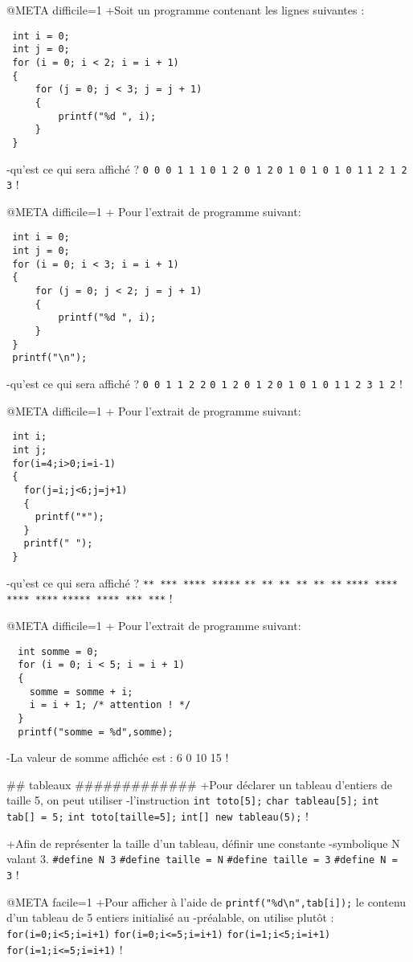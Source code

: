 @META difficile=1
+Soit un programme contenant les lignes suivantes :
 \begin{verbatim}
 int i = 0;
 int j = 0;
 for (i = 0; i < 2; i = i + 1) 
 {
     for (j = 0; j < 3; j = j + 1) 
     {
         printf("%d ", i);
     }
 }
 \end{verbatim}
-qu'est ce qui sera affiché ?
 \verb|0 0 0 1 1 1|
 \verb|0 1 2 0 1 2|
 \verb|0 1 0 1 0 1 0 1|
 \verb|1 2 1 2 3|
!

@META difficile=1
+ Pour l'extrait de programme suivant: 
\begin{verbatim}
 int i = 0;
 int j = 0;
 for (i = 0; i < 3; i = i + 1) 
 {
     for (j = 0; j < 2; j = j + 1) 
     {
         printf("%d ", i);
     }
 }
 printf("\n");
\end{verbatim}
-qu'est ce qui sera affiché ?
 \verb|0 0 1 1 2 2|
 \verb|0 1 2 0 1 2|
 \verb|0 1 0 1 0 1|
 \verb|1 2 3 1 2|
!


@META difficile=1
+ Pour l'extrait de programme suivant: 
\begin{verbatim}
 int i;
 int j;
 for(i=4;i>0;i=i-1)
 {
   for(j=i;j<6;j=j+1)
   {
     printf("*");
   } 
   printf(" ");
 }
 \end{verbatim}
-qu'est ce qui sera affiché ?
 \verb|** *** **** *****|
 \verb|** ** ** ** ** **|
 \verb|**** **** **** ****|
 \verb|***** **** *** ***|
!

@META difficile=1
+ Pour l'extrait de programme suivant: 
 \begin{verbatim} 
  int somme = 0;
  for (i = 0; i < 5; i = i + 1) 
  {
    somme = somme + i;
    i = i + 1; /* attention ! */
  }
  printf("somme = %d",somme); 
\end{verbatim}
-La valeur de somme affichée est : 
 6
 0
 10
 15
!

## tableaux #############
+Pour déclarer un tableau d'entiers de taille 5, on peut utiliser
-l'instruction
 \verb|int toto[5];|
 \verb|char tableau[5];|
 \verb|int tab[] = 5;|
 \verb|int toto[taille=5];|
 \verb|int[] new tableau(5);|
!

+Afin de représenter la taille d'un tableau, définir une constante
-symbolique N valant 3.
 \verb|#define N 3|
 \verb|#define taille = N|
 \verb|#define taille = 3|
 \verb|#define N =  3|
!

@META facile=1
+Pour afficher à l'aide de \verb|printf("%d\n",tab[i]);| le contenu d'un tableau de 5 entiers initialisé au
-préalable, on utilise plutôt :
 \verb|for(i=0;i<5;i=i+1)|
 \verb|for(i=0;i<=5;i=i+1)|
 \verb|for(i=1;i<5;i=i+1)|
 \verb|for(i=1;i<=5;i=i+1)|
!

